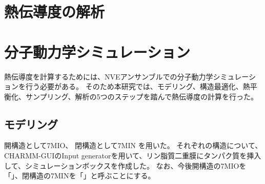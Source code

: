 

\section{熱伝導度の解析}

\section{分子動力学シミュレーション}

熱伝導度を計算するためには、NVEアンサンブルでの分子動力学シミュレーションを行う必要がある。
そのため本研究では、モデリング、構造最適化、熱平衡化、サンプリング、解析の5つのステップを踏んで熱伝導度の計算を行った。

\subsection{モデリング}
開構造として7MIO、%
閉構造として7MIN  %
を用いた。\autocite{noauthor_7mio_nodate, noauthor_7min_nodate, nadezhdinStructuralMechanismHeatinduced2021}
それぞれの構造について、CHARMM-GUIのInput generator\autocite{jo_charmmgui_2008, lee_charmm-gui_2016}を用いて、リン脂質二重膜にタンパク質を挿入して、シミュレーションボックスを作成した。
なお、今後開構造の7MIOを「\openFortyTwo」、閉構造の7MINを「\closeFortyTwo」と呼ぶことにする。

